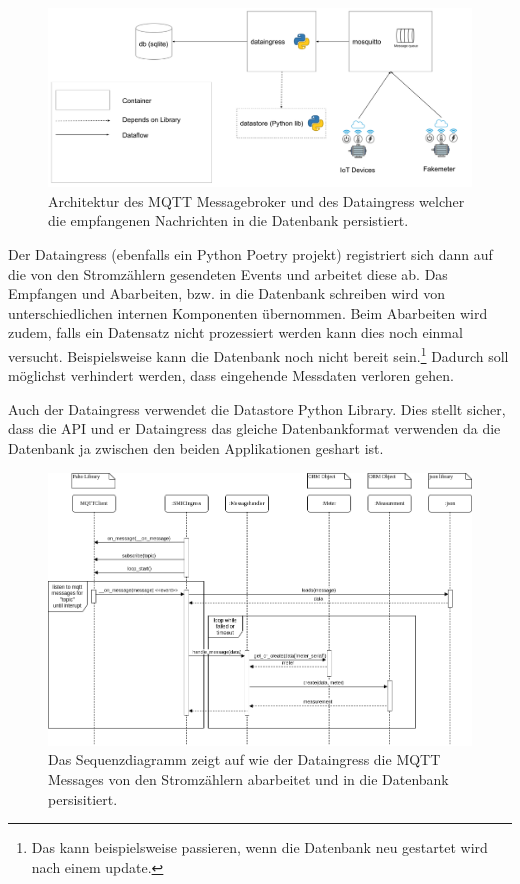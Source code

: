 \begin{figure}[h]
    \centering
    \includegraphics[width=1.0\textwidth]{gfx/smic-arch-mqtt}
    \caption{
        Architektur des \ac{MQTT} Messagebroker und des Dataingress welcher die
        empfangenen Nachrichten in die Datenbank persistiert.
    }
    \label{fig:arch-mqtt}
\end{figure}

Der Dataingress (ebenfalls ein Python Poetry projekt) registriert sich dann auf die von
den Stromzählern gesendeten Events und arbeitet diese ab. Das Empfangen und Abarbeiten, bzw.
in die Datenbank schreiben wird von unterschiedlichen internen Komponenten übernommen.
Beim Abarbeiten wird zudem, falls ein Datensatz nicht prozessiert werden kann dies noch
einmal versucht. Beispielsweise kann die Datenbank noch nicht bereit sein.\footnote{
    Das kann beispielsweise passieren, wenn die Datenbank neu gestartet wird nach einem update.
}
Dadurch soll möglichst verhindert werden, dass eingehende Messdaten verloren gehen.

Auch der Dataingress verwendet die Datastore Python Library. Dies stellt sicher,
dass die \ac{API} und er Dataingress das gleiche Datenbankformat verwenden da
die Datenbank ja zwischen den beiden Applikationen geshart ist.

\begin{figure}[h]
    \centering
    \includegraphics[width=1.0\textwidth]{gfx/dataingress-sequence}
    \caption{
        Das Sequenzdiagramm zeigt auf wie der Dataingress die \ac{MQTT} Messages
        von den Stromzählern abarbeitet und in die Datenbank persisitiert.
    }
    \label{fig:dataingress-sequence}
\end{figure}

